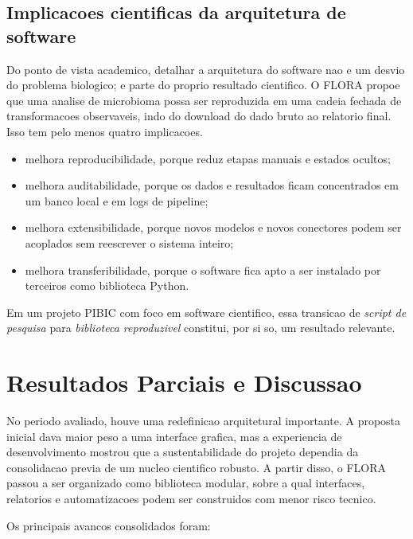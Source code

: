 \documentclass[12pt,a4paper]{article}
\begin{document}
\subsection{Implicacoes cientificas da arquitetura de software}

Do ponto de vista academico, detalhar a arquitetura do software nao e um desvio do problema biologico; e parte do proprio resultado cientifico. O FLORA propoe que uma analise de microbioma possa ser reproduzida em uma cadeia fechada de transformacoes observaveis, indo do download do dado bruto ao relatorio final. Isso tem pelo menos quatro implicacoes.

\begin{itemize}[leftmargin=1.5cm]
    \item melhora reproducibilidade, porque reduz etapas manuais e estados ocultos;
    \item melhora auditabilidade, porque os dados e resultados ficam concentrados em um banco local e em logs de pipeline;
    \item melhora extensibilidade, porque novos modelos e novos conectores podem ser acoplados sem reescrever o sistema inteiro;
    \item melhora transferibilidade, porque o software fica apto a ser instalado por terceiros como biblioteca Python.
\end{itemize}

Em um projeto PIBIC com foco em software cientifico, essa transicao de \textit{script de pesquisa} para \textit{biblioteca reproduzivel} constitui, por si so, um resultado relevante.

\section{Resultados Parciais e Discussao}

No periodo avaliado, houve uma redefinicao arquitetural importante. A proposta inicial dava maior peso a uma interface grafica, mas a experiencia de desenvolvimento mostrou que a sustentabilidade do projeto dependia da consolidacao previa de um nucleo cientifico robusto. A partir disso, o FLORA passou a ser organizado como biblioteca modular, sobre a qual interfaces, relatorios e automatizacoes podem ser construidos com menor risco tecnico.

Os principais avancos consolidados foram:
\end{document}
